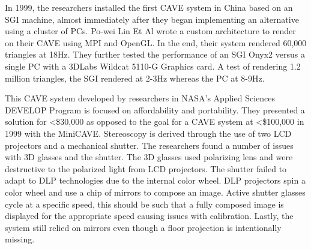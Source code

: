 In 1999, the researchers installed the first CAVE system in China based on an SGI machine, almost immediately after they began implementing an alternative using a cluster of PCs. Po-wei Lin Et Al wrote a custom architecture to render on their CAVE using MPI and OpenGL. In the end, their system rendered 60,000 triangles at 18Hz. They further tested the performance of an SGI Onyx2 versus a single PC with a 3DLabs Wildcat 5110-G Graphics card. A test of rendering 1.2 million triangles, the SGI rendered at 2-3Hz whereas the PC at 8-9Hz.


\filbreak
{}

%	

This CAVE system developed by researchers in NASA's Applied Sciences DEVELOP Program is focused on affordability and portability. They presented a solution for \textless\$30,000 as opposed to the goal for a CAVE system at \textless\$100,000 in 1999 with the MiniCAVE. Stereoscopy is derived through the use of two LCD projectors and a mechanical shutter. The researchers found a number of issues with 3D glasses and the shutter. The 3D glasses used polarizing lens and were destructive to the polarized light from LCD projectors. The shutter failed to adapt to DLP technologies due to the internal color wheel. DLP projectors spin a color wheel and use a chip of mirrors to compose an image. Active shutter glasses cycle at a specific speed, this should be such that a fully composed image is displayed for the appropriate speed causing issues with calibration. Lastly, the system still relied on mirrors even though a floor projection is intentionally missing. 



